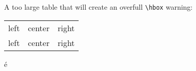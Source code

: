 \documentclass[draft]{umons-Thesis}%
\begin{document}
	A too large table that will create an overfull \verb|\hbox| warning:
	
	\begin{tabular*}{1.2\textwidth}{lcr}
		left & center & right\\
		left & center & right
	\end{tabular*}

	é
	
	\lipsum
\end{document}
